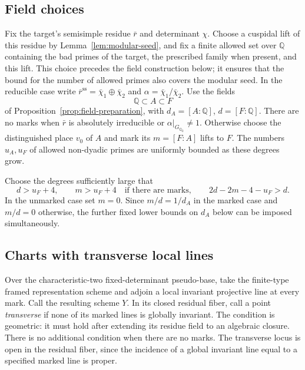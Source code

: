 \subsection{Field choices}

Fix the target's semisimple residue \(\bar r\) and determinant
\(\chi\). Choose a cuspidal lift of this residue by
Lemma~\ref{lem:modular-seed}, and fix a finite allowed set over
\(\mathbb Q\) containing the bad primes of the target, the prescribed
family when present, and this lift. This choice precedes the field construction below;
it ensures that the bound for the number of allowed primes also
covers the modular seed. In the reducible case write
\(\bar r^{\mathrm{ss}}=\bar\chi_1\oplus\bar\chi_2\) and
\(\alpha=\bar\chi_1/\bar\chi_2\). Use the fields
\[
 \mathbb Q\subset A\subset F
\]
of Proposition~\ref{prop:field-preparation}, with
\(d_A=[A:\mathbb Q]\), \(d=[F:\mathbb Q]\).
There are no marks when \(\bar r\) is absolutely
irreducible or \(\alpha|_{G_{\mathbb Q_2}}\ne1\).
Otherwise choose the distinguished place \(v_0\) of \(A\)
and mark its \(m=[F:A]\) lifts to \(F\).
The numbers \(u_A,u_F\) of allowed non-dyadic primes
are uniformly bounded as these degrees grow.

Choose the degrees sufficiently large that
\begin{equation}\label{eq:degree-choices}
 d>u_F+4,\qquad
 m>u_F+4\quad\text{if there are marks},\qquad
 2d-2m-4-u_F>d.
\end{equation}
In the unmarked case set \(m=0\).
Since \(m/d=1/d_A\) in the marked case and \(m/d=0\)
otherwise, the further fixed lower bounds on \(d_A\)
below can be imposed simultaneously.

\subsection{Charts with transverse local lines}

Over the characteristic-two fixed-determinant pseudo-base,
take the finite-type framed representation scheme and
adjoin a local invariant projective line at every mark.
Call the resulting scheme \(Y\).
In its closed residual fiber, call a point \emph{transverse}
if none of its marked lines is globally invariant.
The condition is geometric: it must hold after extending
its residue field to an algebraic closure.
There is no additional condition when there are no marks.
The transverse locus is open in the residual fiber,
since the incidence of a global invariant line equal
to a specified marked line is proper.

